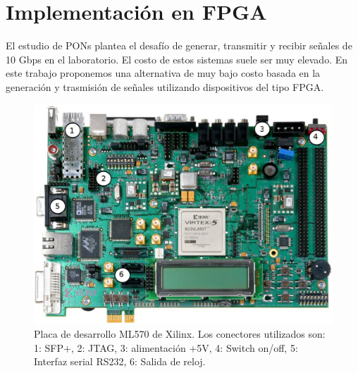 \section{Implementación en FPGA}
El estudio de PONs plantea el desafío de generar, transmitir y recibir
señales de 10 Gbps en el laboratorio. El costo de estos sistemas
suele ser muy elevado. En este trabajo proponemos una alternativa de muy
bajo costo basada en la generación y trasmisión de señales utilizando dispositivos del tipo FPGA.

\begin{figure}[t]
  \centering
    \includegraphics[width=6in]{graphs/ml507.jpg}
\caption {Placa de desarrollo ML570 de Xilinx. Los conectores utilizados son: 1: SFP+, 2: JTAG, 3: alimentación +5V, 4: Switch on/off, 5: Interfaz serial RS232, 6: Salida de reloj.}
\label{fig:fpga}
\end{figure}

